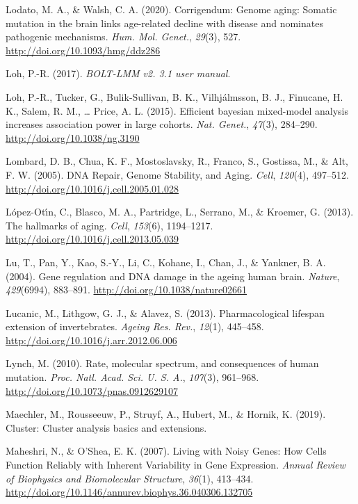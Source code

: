 \documentclass[12pt,twoside]{unicam}
\begin{document}
\begin{cslreferences}
\leavevmode\hypertarget{ref-Lodato2020}{}%
Lodato, M. A., \& Walsh, C. A. (2020). Corrigendum: Genome aging: Somatic mutation in the brain links age-related decline with disease and nominates pathogenic mechanisms. \emph{Hum. Mol. Genet.}, \emph{29}(3), 527. \url{http://doi.org/10.1093/hmg/ddz286}

\leavevmode\hypertarget{ref-Loh2017}{}%
Loh, P.-R. (2017). \emph{BOLT-LMM v2. 3.1 user manual}.

\leavevmode\hypertarget{ref-Loh2015}{}%
Loh, P.-R., Tucker, G., Bulik-Sullivan, B. K., Vilhjálmsson, B. J., Finucane, H. K., Salem, R. M., \ldots{} Price, A. L. (2015). Efficient bayesian mixed-model analysis increases association power in large cohorts. \emph{Nat. Genet.}, \emph{47}(3), 284--290. \url{http://doi.org/10.1038/ng.3190}

\leavevmode\hypertarget{ref-Lombard2005}{}%
Lombard, D. B., Chua, K. F., Mostoslavsky, R., Franco, S., Gostissa, M., \& Alt, F. W. (2005). DNA Repair, Genome Stability, and Aging. \emph{Cell}, \emph{120}(4), 497--512. \url{http://doi.org/10.1016/j.cell.2005.01.028}

\leavevmode\hypertarget{ref-Lopez-Otin2013}{}%
López-Otı́n, C., Blasco, M. A., Partridge, L., Serrano, M., \& Kroemer, G. (2013). The hallmarks of aging. \emph{Cell}, \emph{153}(6), 1194--1217. \url{http://doi.org/10.1016/j.cell.2013.05.039}

\leavevmode\hypertarget{ref-Lu2004}{}%
Lu, T., Pan, Y., Kao, S.-Y., Li, C., Kohane, I., Chan, J., \& Yankner, B. A. (2004). Gene regulation and DNA damage in the ageing human brain. \emph{Nature}, \emph{429}(6994), 883--891. \url{http://doi.org/10.1038/nature02661}

\leavevmode\hypertarget{ref-Lucanic2013}{}%
Lucanic, M., Lithgow, G. J., \& Alavez, S. (2013). Pharmacological lifespan extension of invertebrates. \emph{Ageing Res. Rev.}, \emph{12}(1), 445--458. \url{http://doi.org/10.1016/j.arr.2012.06.006}

\leavevmode\hypertarget{ref-Lynch2010}{}%
Lynch, M. (2010). Rate, molecular spectrum, and consequences of human mutation. \emph{Proc. Natl. Acad. Sci. U. S. A.}, \emph{107}(3), 961--968. \url{http://doi.org/10.1073/pnas.0912629107}

\leavevmode\hypertarget{ref-Maechler2019}{}%
Maechler, M., Rousseeuw, P., Struyf, A., Hubert, M., \& Hornik, K. (2019). Cluster: Cluster analysis basics and extensions.

\leavevmode\hypertarget{ref-Maheshri2007}{}%
Maheshri, N., \& O'Shea, E. K. (2007). Living with Noisy Genes: How Cells Function Reliably with Inherent Variability in Gene Expression. \emph{Annual Review of Biophysics and Biomolecular Structure}, \emph{36}(1), 413--434. \url{http://doi.org/10.1146/annurev.biophys.36.040306.132705}


\end{cslreferences}
\end{document}
